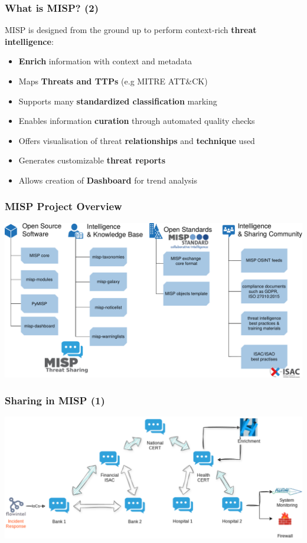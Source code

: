 \begin{frame}
    \frametitle{What is MISP? (2)}
    MISP is designed from the ground up to perform context-rich \textbf{threat intelligence}:
    \vspace{0.5em}
    \begin{itemize}
           \item {\bf Enrich} information with context and metadata
           \item Maps {\bf Threats and TTPs} (e.g MITRE ATT\&CK)
           \item Supports many {\bf standardized classification} marking
           \item Enables information {\bf curation} through automated quality checks
           \item Offers visualisation of threat {\bf relationships} and \textbf{technique} used
           \item Generates customizable {\bf threat reports}
           \item Allows creation of {\bf Dashboard} for trend analysis
    \end{itemize}
\end{frame}

\begin{frame}
    \frametitle{MISP Project Overview}
    \begin{center}
        \includegraphics[width=0.85\linewidth]{misp-overview-simplified.pdf}
    \end{center}
\end{frame}


\begin{frame}
    \frametitle{Sharing in MISP (1)}
    \begin{center}
        \includegraphics[width=0.99\linewidth]{misp-infosharing.png}
    \end{center}
\end{frame}


